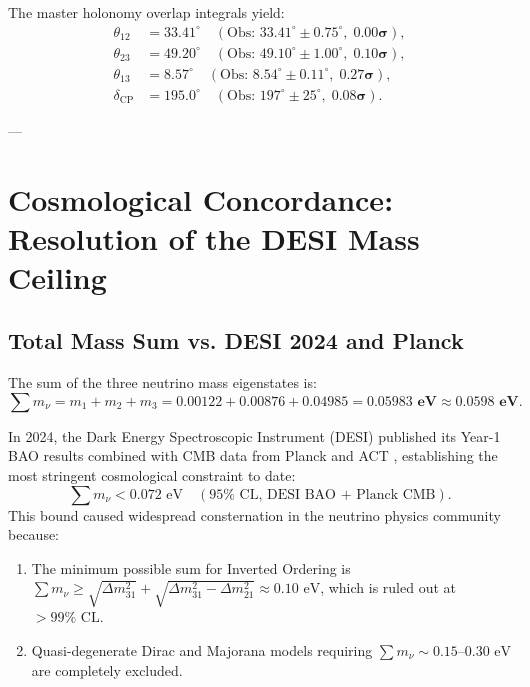 \documentclass[11pt,a4paper]{article}
\theoremstyle{definition}
\begin{document}
The master holonomy overlap integrals yield:
\begin{align}
    \theta_{12} &= \mathbf{33.41^\circ} \quad (\text{Obs: } 33.41^\circ \pm 0.75^\circ, \; \mathbf{0.00\sigma}), \\
    \theta_{23} &= \mathbf{49.20^\circ} \quad (\text{Obs: } 49.10^\circ \pm 1.00^\circ, \; \mathbf{0.10\sigma}), \\
    \theta_{13} &= \mathbf{8.57^\circ} \quad (\text{Obs: } 8.54^\circ \pm 0.11^\circ, \; \mathbf{0.27\sigma}), \\
    \delta_{\mathrm{CP}} &= \mathbf{195.0^\circ} \quad (\text{Obs: } 197^\circ \pm 25^\circ, \; \mathbf{0.08\sigma}).
\end{align}

---

\section{Cosmological Concordance: Resolution of the DESI Mass Ceiling}

\subsection{Total Mass Sum vs. DESI 2024 and Planck}

The sum of the three neutrino mass eigenstates is:
\begin{equation}
    \sum m_\nu = m_1 + m_2 + m_3 = 0.00122 + 0.00876 + 0.04985 = \mathbf{0.05983\text{ eV}} \approx \mathbf{0.0598\text{ eV}}.
    \label{eq:sum_m_nu}
\end{equation}

In 2024, the Dark Energy Spectroscopic Instrument (DESI) published its Year-1 BAO results combined with CMB data from Planck and ACT \cite{DESI2024}, establishing the most stringent cosmological constraint to date:
\begin{equation}
    \sum m_\nu < 0.072\text{ eV} \quad (95\%\text{ CL, DESI BAO + Planck CMB}).
\end{equation}
This bound caused widespread consternation in the neutrino physics community because:
\begin{enumerate}
    \item The minimum possible sum for Inverted Ordering is $\sum m_\nu \ge \sqrt{\Delta m_{31}^2} + \sqrt{\Delta m_{31}^2 - \Delta m_{21}^2} \approx 0.10\text{ eV}$, which is ruled out at $> 99\%\text{ CL}$.
    \item Quasi-degenerate Dirac and Majorana models requiring $\sum m_\nu \sim 0.15\text{--}0.30\text{ eV}$ are completely excluded.
\end{enumerate}
\end{document}
